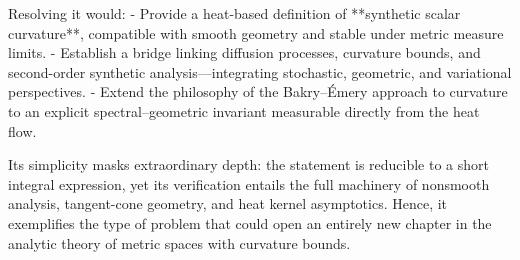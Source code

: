Resolving it would:  
- Provide a heat-based definition of **synthetic scalar curvature**, compatible with smooth geometry and stable under metric measure limits.  
- Establish a bridge linking diffusion processes, curvature bounds, and second-order synthetic analysis—integrating stochastic, geometric, and variational perspectives.  
- Extend the philosophy of the Bakry–Émery approach to curvature to an explicit spectral–geometric invariant measurable directly from the heat flow.  

Its simplicity masks extraordinary depth: the statement is reducible to a short integral expression, yet its verification entails the full machinery of nonsmooth analysis, tangent-cone geometry, and heat kernel asymptotics. Hence, it exemplifies the type of problem that could open an entirely new chapter in the analytic theory of metric spaces with curvature bounds.